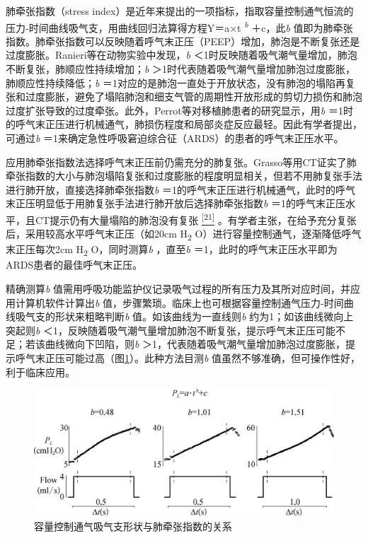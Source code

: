 肺牵张指数（stress
index）是近年来提出的一项指标，指取容量控制通气恒流的压力-时间曲线吸气支，用曲线回归法算得方程Y＝a×t
\textsuperscript{\emph{b}} ＋c，此\emph{b}
值即为肺牵张指数。肺牵张指数可以反映随着呼气末正压（PEEP）增加，肺泡是不断复张还是过度膨胀。Ranieri等在动物实验中发现，\emph{b}
＜1时反映随着吸气潮气量增加，肺泡不断复张，肺顺应性持续增加；\emph{b}
＞1时代表随着吸气潮气量增加肺泡过度膨胀，肺顺应性持续降低；\emph{b}
＝1对应的是肺泡一直处于开放状态，没有肺泡的塌陷再复张和过度膨胀，避免了塌陷肺泡和细支气管的周期性开放形成的剪切力损伤和肺泡过度扩张导致的过度牵张。此外，Perrot等对移植肺患者的研究显示，用\emph{b}
＝1时的呼气末正压进行机械通气，肺损伤程度和局部炎症反应最轻。因此有学者提出，可通过\emph{b}
＝1来确定急性呼吸窘迫综合征（ARDS）的患者的呼气末正压水平。

应用肺牵张指数法选择呼气末正压前仍需充分的肺复张。Grasso等用CT证实了肺牵张指数的大小与肺泡塌陷复张和过度膨胀的程度明显相关，但若不用肺复张手法进行肺开放，直接选择肺牵张指数\emph{b}
＝1的呼气末正压进行机械通气，此时的呼气末正压明显低于用肺复张手法进行肺开放后选择肺牵张指数\emph{b}
＝1的呼气末正压水平，且CT提示仍有大量塌陷的肺泡没有复张
\protect\hyperlink{text00011.htmlux5cux23ch21-10}{\textsuperscript{{[}21{]}}}
。有学者主张，在给予充分复张后，采用较高水平呼气末正压（如20cm
H\textsubscript{2} O）进行容量控制通气，逐渐降低呼气末正压每次2cm
H\textsubscript{2} O，同时测算\emph{b} ，直至\emph{b}
＝1，此时的呼气末正压水平即为ARDS患者的最佳呼气末正压。

精确测算\emph{b}
值需用呼吸功能监护仪记录吸气过程的所有压力及其所对应时间，并应用计算机软件计算出\emph{b}
值，步骤繁琐。临床上也可根据容量控制通气压力-时间曲线吸气支的形状来粗略判断\emph{b}
值。如该曲线为一直线则\emph{b} 约为1；如该曲线微向上突起则\emph{b}
＜1，反映随着吸气潮气量增加肺泡不断复张，提示呼气末正压可能不足；若该曲线微向下凹陷，则\emph{b}
＞1，代表随着吸气潮气量增加肺泡过度膨胀，提示呼气末正压可能过高（图\ref{fig5-3}）。此种方法目测\emph{b}
值虽然不够准确，但可操作性好，利于临床应用。

\begin{figure}[!htbp]
 \centering
 \includegraphics{./images/Image00052.jpg}
 \captionsetup{justification=centering}
 \caption{容量控制通气吸气支形状与肺牵张指数的关系}
 \label{fig5-3}
  \end{figure} 

